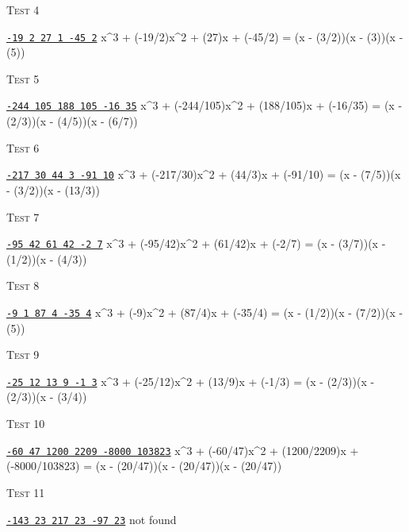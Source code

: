\textsc{Test 4}
\begin{console}[commandchars=\\\{\}]
\underline{\texttt{-19 2 27 1 -45 2}}
x^3 + (-19/2)x^2 + (27)x + (-45/2) = (x - (3/2))(x - (3))(x - (5))
\end{console}


\textsc{Test 5}
\begin{console}[fontsize=\small,commandchars=\\\{\}]
\underline{\texttt{-244 105 188 105 -16 35}}
x^3 + (-244/105)x^2 + (188/105)x + (-16/35) = (x - (2/3))(x - (4/5))(x - (6/7))
\end{console}

\textsc{Test 6}
\begin{console}[commandchars=\\\{\}]
\underline{\texttt{-217 30 44 3 -91 10}}
x^3 + (-217/30)x^2 + (44/3)x + (-91/10) = (x - (7/5))(x - (3/2))(x - (13/3)) 
\end{console}


\textsc{Test 7}
\begin{console}[commandchars=\\\{\}]
\underline{\texttt{-95 42 61 42 -2 7}}
x^3 + (-95/42)x^2 + (61/42)x + (-2/7) = (x - (3/7))(x - (1/2))(x - (4/3))
\end{console}


\textsc{Test 8}
\begin{console}[commandchars=\\\{\}]
\underline{\texttt{-9 1 87 4 -35 4}}
x^3 + (-9)x^2 + (87/4)x + (-35/4) = (x - (1/2))(x - (7/2))(x - (5))
\end{console}

\textsc{Test 9}
\begin{console}[commandchars=\\\{\}]
\underline{\texttt{-25 12 13 9 -1 3}}
x^3 + (-25/12)x^2 + (13/9)x + (-1/3) = (x - (2/3))(x - (2/3))(x - (3/4))
\end{console}


\textsc{Test 10}
\begin{console}[fontsize=\scriptsize,commandchars=\\\{\}]
\underline{\texttt{-60 47 1200 2209 -8000 103823}}
x^3 + (-60/47)x^2 + (1200/2209)x + (-8000/103823) = (x - (20/47))(x - (20/47))(x - (20/47))
\end{console}

\textsc{Test 11}
\begin{console}[commandchars=\\\{\}]
\underline{\texttt{-143 23 217 23 -97 23}}
not found
\end{console}

